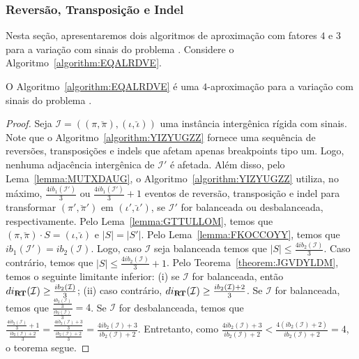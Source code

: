 \subsubsection{Reversão, Transposição e Indel}

Nesta seção, apresentaremos dois algoritmos de aproximação com fatores $4$ e $3$ para a variação com sinais do problema \SbIRTI{}. Considere o Algoritmo~\ref{algorithm:EQALRDVE}.



\begin{theorem}\label{theorem:PTXWEJRJ}
O Algoritmo~\ref{algorithm:EQALRDVE} é uma $4$-aproximação para a variação com sinais do problema \SbIRTI{}.
\end{theorem}
\begin{proof}
Seja $\mathcal{I}=((\pi,\breve\pi),(\iota,\breve\iota))$ uma instância intergênica rígida com sinais. Note que o Algoritmo~\ref{algorithm:YIZYUGZZ} fornece uma sequência de reversões, transposições e indels que afetam apenas breakpoints tipo um. Logo, nenhuma adjacência intergênica de $\mathcal{I'}$ é afetada. Além disso, pelo Lema~\ref{lemma:MUTXDAUG}, o Algoritmo~\ref{algorithm:YIZYUGZZ} utiliza, no máximo, $\frac{4ib_1(\mathcal{I'})}{3}$ ou $\frac{4ib_1(\mathcal{I'})}{3} + 1$ eventos de reversão, transposição e indel para transformar $(\pi',\breve\pi')$ em $(\iota',\breve\iota')$, se $\mathcal{I'}$ for balanceada ou desbalanceada, respectivamente. Pelo Lema~\ref{lemma:GTTULLOM}, temos que $(\pi,\breve\pi) \cdot S = (\iota,\breve\iota)$ e $|S| = |S'|$. Pelo Lema~\ref{lemma:FKOCCOYY}, temos que $ib_1(\mathcal{I'}) = ib_2(\mathcal{I})$. Logo, caso $\mathcal{I}$ seja balanceada temos que $|S| \le \frac{4ib_2(\mathcal{I})}{3}$. Caso contrário, temos que $|S| \le \frac{4ib_2(\mathcal{I})}{3} + 1$. Pelo Teorema~\ref{theorem:JGVDYLDM}, temos o seguinte limitante inferior: (i) se $\mathcal{I}$ for balanceada, então $di_{\textbf{RT}}(\mathcal{I}) \ge \frac{ib_2(\mathcal{I})}{3}$; (ii) caso contrário, $di_{\textbf{RT}}(\mathcal{I}) \ge \frac{ib_2(\mathcal{I}) + 2}{3}$. Se $\mathcal{I}$ for balanceada, temos que $\frac{\frac{4b_2(\mathcal{I})}{3}}{\frac{ib_2(\mathcal{I})}{3}}=4$. Se $\mathcal{I}$ for desbalanceada,  temos que $\frac{\frac{4ib_2(\mathcal{I})}{3} + 1}{\frac{ib_2(\mathcal{I}) + 2}{3}}=\frac{\frac{4ib_2(\mathcal{I})+3}{3}}{\frac{ib_2(\mathcal{I}) + 2}{3}}=\frac{4ib_2(\mathcal{I})+3}{ib_2(\mathcal{I})+2}$. Entretanto, como $\frac{4ib_2(\mathcal{I})+3}{ib_2(\mathcal{I})+2}<\frac{4(ib_2(\mathcal{I})+2)}{ib_2(\mathcal{I})+2}=4$, o teorema segue.
\end{proof}

